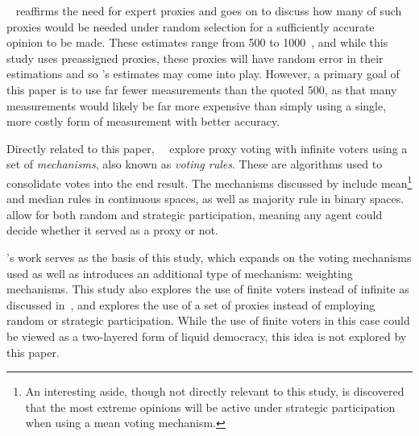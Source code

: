 ~\cite{Mueller1972} reaffirms the need for expert proxies and
goes on to discuss how many of such proxies would be needed under random
selection for a sufficiently accurate opinion to be made.
These estimates range from 500 to 1000~\cite[para.~3.2]{Mueller1972}, and
while this study uses preassigned proxies, these proxies will have random
error in their estimations and so 's estimates may come into
play.
However, a primary goal of this paper is to use far fewer measurements than the
quoted 500, as that many measurements would likely be far more expensive than
simply using a single, more costly form of measurement with better accuracy.

Directly related to this paper,\ ~\cite{Cohensius2017} explore
proxy voting with infinite voters using a set of \textit{mechanisms}, also
known as \textit{voting rules}.
These are algorithms used to consolidate votes into the end result.
The mechanisms discussed by  include mean\footnote{An
interesting aside, though not directly relevant to this
study, is  discovered that the most extreme opinions will be
active under strategic participation when using a mean voting
mechanism\cite[lemma~9]{Cohensius2017}.}
and median rules in continuous spaces, as well as majority rule in
binary spaces.
 allow for both random and strategic participation, meaning any
agent could decide whether it served as a proxy or not.

's work serves as the basis of this study, which expands on
the voting mechanisms used as well as introduces an additional type of
mechanism: weighting mechanisms.
This study also explores the use of finite voters instead of infinite as discussed
in~\cite{Cohensius2017}, and explores the use of a set of proxies instead of
employing random or strategic participation.
While the use of finite voters in this case could be viewed as a two-layered
form of liquid democracy, this idea is not explored by this paper.
